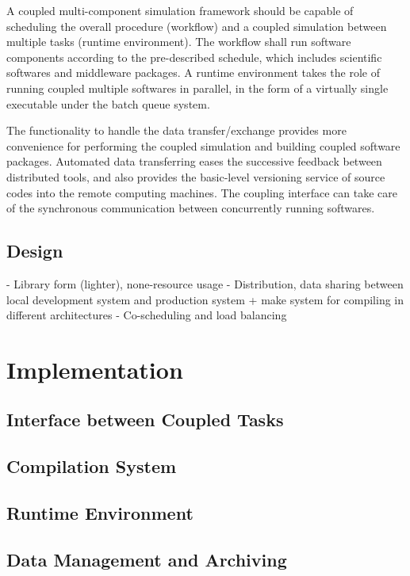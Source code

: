 \documentclass[10pt,conference]{IEEEtran}
\begin{document}
A coupled multi-component simulation framework should be capable of
scheduling the overall procedure (workflow) and
a coupled simulation between multiple tasks (runtime environment).
The workflow shall run software components according to 
the pre-described schedule, which includes scientific softwares 
and middleware packages. A runtime environment takes the role of
running coupled multiple softwares in parallel, 
in the form of a virtually single executable 
under the batch queue system.

The functionality to handle the data transfer/exchange provides
more convenience for performing the coupled simulation and 
building coupled software packages. Automated data transferring
eases the successive feedback between distributed tools,
and also provides the basic-level versioning service 
of source codes into the remote computing machines.
The coupling interface can take care of the synchronous communication
between concurrently running softwares.

\subsection{Design}


- Library form (lighter), none-resource usage
- Distribution, data sharing between local development system and production system + make system for compiling in different architectures
- Co-scheduling and load balancing

\section{Implementation}
\label{sec:implementation}

\subsection{Interface between Coupled Tasks}

\subsection{Compilation System}

\subsection{Runtime Environment}

\subsection{Data Management and Archiving}
\end{document}
